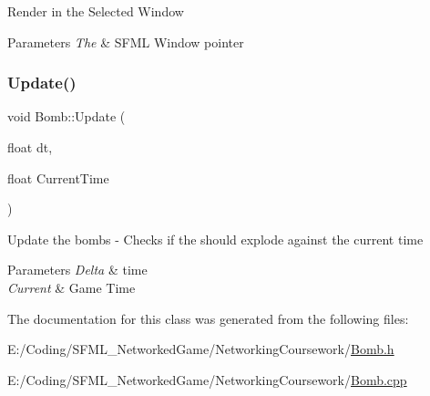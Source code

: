 Render in the Selected Window


\begin{DoxyParams}{Parameters}
{\em The} & S\+F\+ML Window pointer \\
\hline
\end{DoxyParams}
\hypertarget{class_bomb_a824b48a1cabce718db5b9b0c84452a35}{}\label{class_bomb_a824b48a1cabce718db5b9b0c84452a35} 
\subsubsection{\texorpdfstring{Update()}{Update()}}
{\footnotesize\ttfamily void Bomb\+::\+Update (\begin{DoxyParamCaption}\item[{float}]{dt,  }\item[{float}]{Current\+Time }\end{DoxyParamCaption})}

Update the bombs -\/ Checks if the should explode against the current time


\begin{DoxyParams}{Parameters}
{\em Delta} & time \\
\hline
{\em Current} & Game Time \\
\hline
\end{DoxyParams}


The documentation for this class was generated from the following files\+:\begin{DoxyCompactItemize}
\item 
E\+:/\+Coding/\+S\+F\+M\+L\+\_\+\+Networked\+Game/\+Networking\+Coursework/\hyperlink{_bomb_8h}{Bomb.\+h}\item 
E\+:/\+Coding/\+S\+F\+M\+L\+\_\+\+Networked\+Game/\+Networking\+Coursework/\hyperlink{_bomb_8cpp}{Bomb.\+cpp}\end{DoxyCompactItemize}
